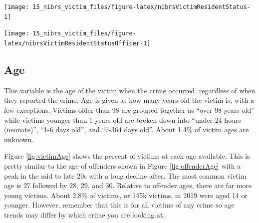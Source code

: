 \documentclass[
]{krantz}
\let\origfigure\figure
\let\endorigfigure\endfigure
\renewenvironment{figure}[1][2] {
    \expandafter\origfigure\expandafter[H]
} {
    \endorigfigure
}
\begin{document}
\begin{figure}

{\centering \texttt{[image: 15\_nibrs\_victim\_files/figure-latex/nibrsVictimResidentStatus-1]} 

}

\caption{The share of victims by resident status in the reporting agency's jurisdiction, 1991-2022.}\label{fig:nibrsVictimResidentStatus}
\end{figure}

\begin{figure}

{\centering \texttt{[image: 15\_nibrs\_victim\_files/figure-latex/nibrsVictimResidentStatusOfficer-1]} 

}

\caption{The share of victims by resident status in the reporting agency's jurisdiction for law enforcement officer victims, 1991-2022.}\label{fig:nibrsVictimResidentStatusOfficer}
\end{figure}

\subsection{Age}\label{age-3}

This variable is the age of the victim when the crime
occurred, regardless of when they reported the crime. Age is
given as how many years old the victim is, with a few
exceptions. Victims older than 98 are grouped together as
``over 98 years old'' while victims younger than 1 years old
are broken down into ``under 24 hours (neonate)'', ``1-6
days old'', and ``7-364 days old''. About 1.4\% of victim
ages are unknown.

Figure \ref{fig:victimAge} shows the percent of victims at
each age available. This is pretty similar to the age of
offenders shown in Figure \ref{fig:offenderAge} with a peak
in the mid to late 20s with a long decline after. The most
common victim age is 27 followed by 28, 29, and 30. Relative
to offender ages, there are far more young victims. About
2.8\% of victims, or 145k victims, in 2019 were aged 14 or
younger. However, remember that this is for all victims of
any crime so age trends may differ by which crime you are
looking at.
\end{document}
